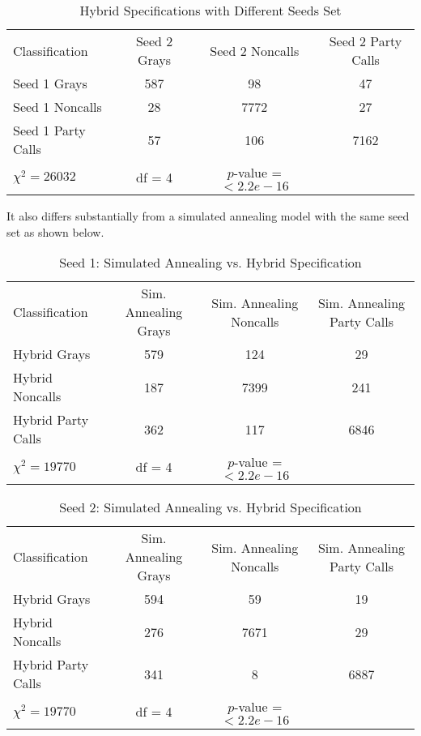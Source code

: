 \documentclass[12pt]{article}
\begin{document}
	\begin{table}[!ht]
		\centering
		\caption{Hybrid Specifications with Different Seeds Set}
		\begin{tabular}{l c c c}
			\hline
			\hline
			Classification &  Seed 2 Grays & Seed 2 Noncalls & Seed 2 Party Calls \\
			Seed 1 Grays      &  587 &     98    &     47 \\
			Seed 1 Noncalls  &   28  &  7772     &    27 \\
			Seed 1 Party Calls & 57  &   106      & 7162 \\
			\hline
			$ \chi^{2} = 26032 $ & df = 4 & $p$-value = $< 2.2e-16$ & \\
			
		\end{tabular}
	\end{table}

It also differs substantially from a simulated annealing model with the same seed set as shown below.

	\begin{table}[!ht]
		\centering
		\caption{Seed 1: Simulated Annealing vs. Hybrid Specification}
		\begin{tabular}{l c c c}
			\hline
			\hline
			Classification &  Sim. Annealing Grays & Sim. Annealing Noncalls & Sim. Annealing Party Calls \\
			Hybrid Grays      &  579 &    124    &     29 \\
			Hybrid Noncalls  &   187 &   7399    &    241 \\
			Hybrid Party Calls & 362 &    117     &  6846 \\
			\hline
			$ \chi^{2} = 19770$ & df = 4 & $p$-value = $< 2.2e-16$ & \\
			
		\end{tabular}
	\end{table}

	\begin{table}[!ht]
		\centering
		\caption{Seed 2: Simulated Annealing vs. Hybrid Specification}
		\begin{tabular}{l c c c}
			\hline
			\hline
			Classification &  Sim. Annealing Grays & Sim. Annealing Noncalls & Sim. Annealing Party Calls \\
			Hybrid Grays      &  594 &     59    &     19 \\
			Hybrid Noncalls  &   276 &   7671    &     29 \\
			Hybrid Party Calls & 341 &      8    &   6887 \\
			\hline
			$ \chi^{2} = 19770$ & df = 4 & $p$-value = $< 2.2e-16$ & \\
			
		\end{tabular}
	\end{table}
\end{document}
